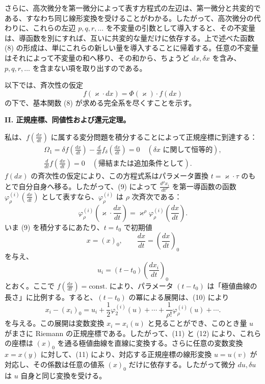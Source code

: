 \documentclass[11pt]{article}
\begin{document}
さらに、高次微分を第一微分によって表す方程式の左辺は、第一微分と共変的である、すなわち同じ線形変換を受けることがわかる。したがって、高次微分の代わりに、これらの左辺 \(p,q,r,\ldots\) を不変量の引数として導入すると、その不変量は、導函数を別にすれば、互いに共変的な量だけに依存する。上で述べた函数 (8) の形成は、単にこれらの新しい量を導入することに帰着する。任意の不変量はそれによって不変量の和へ移り、その和から、ちょうど \(dx,\delta x\) を含み、\(p,q,r,\ldots\) を含まない項を取り出すのである。

以下では、斉次性の仮定
\[
f(\varkappa\cdot dx)=\Phi(\varkappa)\cdot f(dx)
\]
の下で、基本関数 (8) が求める完全系を尽くすことを示す。

\begin{center}
\textbf{II. 正規座標、同値性および還元定理。}
\end{center}

私は、\(f\!\left(\frac{dx}{dt}\right)\) に属する変分問題を積分することによって正規座標に到達する：
\begin{equation}
\begin{gathered}
\Omega_1=\delta f\!\left(\frac{dx}{dt}\right)
-\frac{d}{dt}f_\delta\!\left(\frac{dx}{dt}\right)=0
\quad(\text{\(\delta x\) に関して恒等的}),\\
\frac{d}{dt}f\!\left(\frac{dx}{dt}\right)=0
\quad(\text{帰結または追加条件として}).
\end{gathered}
\tag{9}
\end{equation}
\(f(dx)\) の斉次性の仮定により、この方程式系はパラメータ置換 \(t=\varkappa\cdot\tau\) のもとで自分自身へ移る。したがって、(9) によって \(\frac{d^\rho x_i}{dt^\rho}\) を第一導函数の函数
\(\varphi_\rho^{(i)}\!\left(\frac{dx}{dt}\right)\) として表すなら、\(\varphi_\rho^{(i)}\) は \(\rho\) 次斉次である：
\begin{equation}
\varphi_\rho^{(i)}\!\left(\varkappa\cdot\frac{dx}{dt}\right)
=\varkappa^\rho\varphi_\rho^{(i)}\!\left(\frac{dx}{dt}\right).
\tag{10}
\end{equation}
いま (9) を積分するにあたり、\(t=t_0\) で初期値
\[
x=(x)_0,\qquad \frac{dx}{dt}=\left(\frac{dx}{dt}\right)_0
\]
を与え、
\begin{equation}
u_i=(t-t_0)\left(\frac{dx_i}{dt}\right)_0
\tag{11}
\end{equation}
とおく。ここで \(f\!\left(\frac{dx}{dt}\right)=\mathrm{const.}\) により、パラメータ \((t-t_0)\) は「極値曲線の長さ」に比例する。すると、\((t-t_0)\) の冪による展開は、(10) により
\begin{equation}
x_i-(x_i)_0=u_i+\frac12\varphi_2^{(i)}(u)+\cdots+
\frac{1}{\rho!}\varphi_\rho^{(i)}(u)+\cdots .
\tag{12}
\end{equation}
を与える。この展開は変数変換 \(x_i=x_i(u)\) と見ることができ、このとき量 \(u\) がまさに Riemann の正規座標である。したがって、(11) と (12) により、これらの座標は \((x)_0\) を通る極値曲線を直線に変換する。さらに任意の変数変換 \(x=x(y)\) に対して、(11) により、対応する正規座標の線形変換 \(u=u(v)\) が対応し、その係数は任意の値系 \((x)_0\) だけに依存する。したがって微分 \(du,\delta u\) は \(u\) 自身と同じ変換を受ける。
\end{document}
